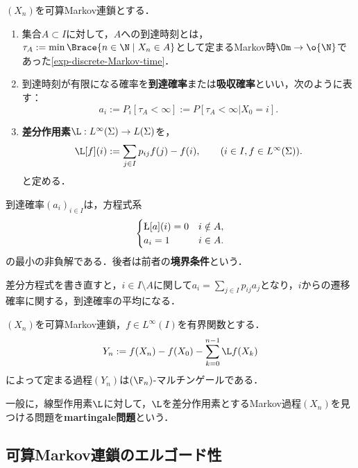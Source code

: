 \documentclass[uplatex,dvipdfmx]{jsreport}
\begin{document}
\begin{definition}
    $(X_n)$を可算Markov連鎖とする．
    \begin{enumerate}
        \item 集合$A\subset I$に対して，$A$への到達時刻とは，$\tau_A:=\min\Brace{n\in\N\mid X_n\in A}$として定まるMarkov時$\Om\to\o{\N}$であった\ref{exp-discrete-Markov-time}．
        \item 到達時刻が有限になる確率を\textbf{到達確率}または\textbf{吸収確率}といい，次のように表す：
        \[a_i:=P_i[\tau_A<\infty]:=P[\tau_A<\infty|X_0=i].\]
        \item \textbf{差分作用素}$\L:L^\infty(\Sigma)\to L(\Sigma)$を，
        \[\L[f](i):=\sum_{j\in I}p_{ij}f(j)-f(i),\qquad(i\in I,f\in L^\infty(\Sigma)).\]
        と定める．
    \end{enumerate}
\end{definition}

\begin{theorem}[到達確率の特徴付け]
    到達確率$(a_i)_{i\in I}$は，方程式系
    \[\begin{cases}
        \L[a](i)=0&i\notin A,\\
        a_i=1&i\in A.
    \end{cases}\]
    の最小の非負解である．後者は前者の\textbf{境界条件}という．
\end{theorem}
\begin{remarks}
    差分方程式を書き直すと，$i\in I\setminus A$に関して$a_i=\sum_{j\in I}p_{ij}a_j$となり，$i$からの遷移確率に関する，到達確率の平均になる．
\end{remarks}

\begin{theorem}[差分作用素の定めるマルチンゲール]
    $(X_n)$を可算Markov連鎖，$f\in L^\infty(I)$を有界関数とする．
    \[Y_n:=f(X_n)-f(X_0)-\sum_{k=0}^{n-1}\L f(X_k)\]
    によって定まる過程$(Y_n)$は$(\F_n)$-マルチンゲールである．
\end{theorem}

\begin{remarks}
    一般に，線型作用素$\L$に対して，$\L$を差分作用素とするMarkov過程$(X_n)$を見つける問題を\textbf{martingale問題}という\cite{Stroock-Varadhan06-MultidimensionalDiffusionProcesses}．
\end{remarks}

\subsection{可算Markov連鎖のエルゴード性}
\end{document}
